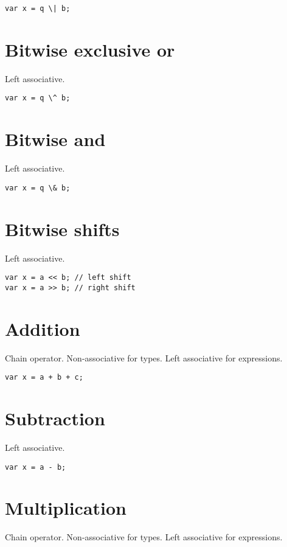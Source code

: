 \documentclass[oneside]{book}
\begin{document}
\begin{verbatim}
var x = q \| b;
\end{verbatim}


\section{Bitwise exclusive or}
Left associative.

\begin{verbatim}
var x = q \^ b;
\end{verbatim}


\section{Bitwise and}
Left associative.

\begin{verbatim}
var x = q \& b;
\end{verbatim}


\section{Bitwise shifts}
Left associative.

\begin{verbatim}
var x = a << b; // left shift
var x = a >> b; // right shift
\end{verbatim}


\section{Addition}
Chain operator. Non-associative for types. 
Left associative for expressions.

\begin{verbatim}
var x = a + b + c;
\end{verbatim}


\section{Subtraction}
Left associative.

\begin{verbatim}
var x = a - b;
\end{verbatim}


\section{Multiplication}
Chain operator. Non-associative for types.
Left associative for expressions.
\end{document}
